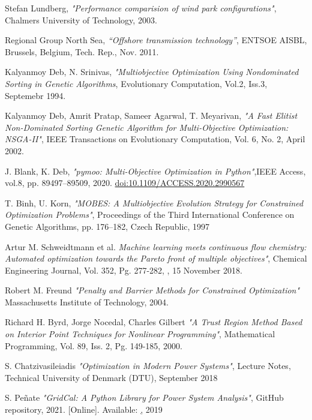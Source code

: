 \documentclass[a4paper,11pt, titlepage, twoside]{article}
\begin{document}
\begin{thebibliography}{99}
{Stefan Lundberg},
\textit{"Performance comparision of wind park configurations"}, Chalmers University of Technology, 2003.

{Regional Group North Sea},
\textit{“Offshore transmission technology”}, ENTSOE AISBL, Brussels, Belgium, Tech. Rep., Nov. 2011.



{Kalyanmoy Deb, N. Srinivas},
\textit{"Multiobjective Optimization Using Nondominated Sorting in Genetic Algorithms}, Evolutionary Computation, Vol.2, Iss.3, Septemebr 1994.

{Kalyanmoy Deb, Amrit Pratap, Sameer Agarwal, T. Meyarivan},
\textit{"A Fast Elitist Non-Dominated Sorting Genetic Algorithm for Multi-Objective Optimization: NSGA-II"}, IEEE Transactions on Evolutionary Computation, Vol. 6, No. 2, April 2002.

{J. Blank, K. Deb},
\textit{"pymoo: Multi-Objective Optimization in Python"},IEEE Access, vol.8, pp. 89497–89509, 2020. \href{https://ieeexplore.ieee.org/document/9078759}{doi:10.1109/ACCESS.2020.2990567}

{T. Binh, U. Korn},
\textit{"MOBES: A Multiobjective Evolution Strategy for Constrained Optimization Problems"}, Proceedings of the Third International Conference on Genetic Algorithms, 
pp. 176–182, Czech Republic, 1997

{Artur M. Schweidtmann et al.}
\textit{Machine learning meets continuous flow chemistry: Automated
optimization towards the Pareto front of multiple objectives"}, Chemical Engineering Journal, Vol. 352, Pg. 277-282, , 15 November 2018.

{Robert M. Freund}
\textit{"Penalty and Barrier Methods for Constrained Optimization"} Massachusetts Institute of Technology, 2004.

{Richard H. Byrd, Jorge Nocedal, Charles Gilbert}
\textit{"A Trust Region Method Based on Interior Point Techniques for Nonlinear Programming"}, Mathematical Programming, Vol. 89, Iss. 2, Pg. 149-185, 2000.
 

{S. Chatzivasileiadis}
\textit{"Optimization in Modern Power Systems"}, Lecture Notes, Technical University of Denmark (DTU), September 2018

{S. Peñate}
\textit{"GridCal: A Python Library for Power System Analysis"}, GitHub repository, 2021. [Online]. Available: \href{https://github.com/SanPen/GridCal}, 2019


\end{thebibliography}
\end{document}
